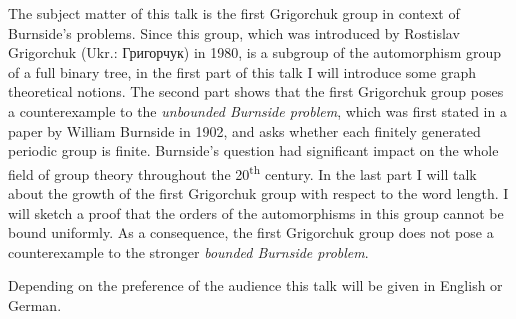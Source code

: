 
The subject matter of this talk is the first Grigorchuk group in context of
Burnside's problems. Since this group, which was introduced by Rostislav
Grigorchuk (Ukr.: Григорчук) in 1980, is a subgroup of the automorphism group
of a full binary tree, in the first part of this talk I will introduce some
graph theoretical notions. The second part shows that the first Grigorchuk
group poses a counterexample to the \emph{unbounded Burnside problem}, which
was first stated in a paper by William Burnside in 1902, and asks whether each
finitely generated periodic group is finite. Burnside's question had
significant impact on the whole field of group theory throughout the
20\textsuperscript{th} century. In the last part I will talk about the growth
of the first Grigorchuk group with respect to the word length. I will sketch a
proof that the orders of the automorphisms in this group cannot be bound
uniformly. As a consequence, the first Grigorchuk group does not pose a
counterexample to the stronger \emph{bounded Burnside problem}.

Depending on the preference of the audience this talk will be given in English
or German.

